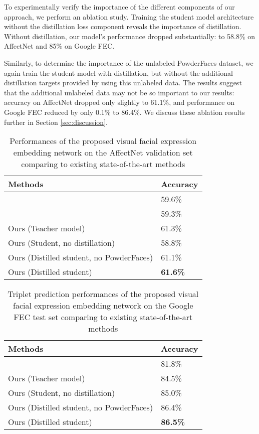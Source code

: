 \documentclass[times,twocolumn,final,authoryear]{elsarticle}
\begin{document}
	To experimentally verify the importance of the different components of our approach, we perform an ablation study. Training the student model architecture without the distillation loss component reveals the importance of distillation. Without distillation, our model's performance dropped substantially: to 58.8\% on AffectNet and 85\% on Google FEC.
	
	Similarly, to determine the importance of the unlabeled PowderFaces dataset, we again train the student model with distillation, but without the additional distillation targets provided by using this unlabeled data. The results suggest that the additional unlabeled data may not be so important to our results: accuracy on AffectNet dropped only slightly to 61.1\%, and performance on Google FEC reduced by only 0.1\% to 86.4\%. We discuss these ablation results further in Section \ref{sec:discussion}.
	
	\begin{table} \caption{Performances of the proposed visual facial expression embedding network on the AffectNet validation set comparing to existing state-of-the-art methods}
		\begin{tabular*}{\columnwidth}{l|l} 
			\hline 
			\textbf{Methods} & \textbf{Accuracy}\\
			\hline
			\cite{Georgescu2019}& 59.6\%\\
			
			\cite{Siqueira2020}& 59.3\%\\
			
			Ours (Teacher model) & 61.3\%\\
			
			Ours (Student, no distillation) & 58.8\%\\
			
			Ours (Distilled student, no PowderFaces) & 61.1\%\\
			
			Ours (Distilled student) &  \textbf{61.6\%}\\
			\hline
		\end{tabular*}
		\label{tab:affectnet_results}
	\end{table}
	
	\begin{table}
		\caption{Triplet prediction performances of the proposed visual facial expression embedding network on the Google FEC test set comparing to existing state-of-the-art methods }
		\begin{tabular*}{\columnwidth}{l|l} 
			\hline
			\textbf{Methods} & \textbf{Accuracy} \\
			\hline
			\cite{GoogleFEC}& 81.8\% \\
			Ours (Teacher model) & 84.5\% \\
			Ours (Student, no distillation) & 85.0\% \\
			Ours (Distilled student, no PowderFaces) & 86.4\% \\
			Ours (Distilled student) & \textbf{86.5\%}\\
			\hline
		\end{tabular*}
		
		\label{tab:fec_results}
	\end{table}
	
\end{document}
